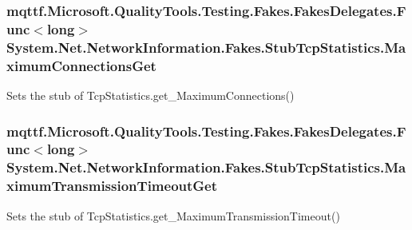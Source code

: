 \hypertarget{class_system_1_1_net_1_1_network_information_1_1_fakes_1_1_stub_tcp_statistics_abc1808480a923ed892ee3597485f34d5}{
\subsubsection[{Maximum\-Connections\-Get}]{\setlength{\rightskip}{0pt plus 5cm}mqttf.\-Microsoft.\-Quality\-Tools.\-Testing.\-Fakes.\-Fakes\-Delegates.\-Func$<$long$>$ System.\-Net.\-Network\-Information.\-Fakes.\-Stub\-Tcp\-Statistics.\-Maximum\-Connections\-Get}}\label{class_system_1_1_net_1_1_network_information_1_1_fakes_1_1_stub_tcp_statistics_abc1808480a923ed892ee3597485f34d5}


Sets the stub of Tcp\-Statistics.\-get\-\_\-\-Maximum\-Connections()

\hypertarget{class_system_1_1_net_1_1_network_information_1_1_fakes_1_1_stub_tcp_statistics_a6ee353e20db70c112f7350f9165e19a2}{
\subsubsection[{Maximum\-Transmission\-Timeout\-Get}]{\setlength{\rightskip}{0pt plus 5cm}mqttf.\-Microsoft.\-Quality\-Tools.\-Testing.\-Fakes.\-Fakes\-Delegates.\-Func$<$long$>$ System.\-Net.\-Network\-Information.\-Fakes.\-Stub\-Tcp\-Statistics.\-Maximum\-Transmission\-Timeout\-Get}}\label{class_system_1_1_net_1_1_network_information_1_1_fakes_1_1_stub_tcp_statistics_a6ee353e20db70c112f7350f9165e19a2}


Sets the stub of Tcp\-Statistics.\-get\-\_\-\-Maximum\-Transmission\-Timeout()

